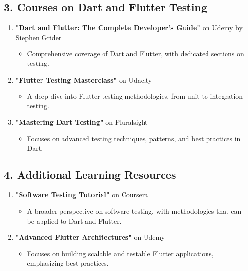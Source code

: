 \subsection*{3. Courses on Dart and Flutter Testing}

\begin{enumerate}
 \item \textbf{"Dart and Flutter: The Complete Developer's Guide"} on Udemy by Stephen Grider
 \begin{itemize}
  \item Comprehensive coverage of Dart and Flutter, with dedicated sections on testing.
 \end{itemize}

 \item \textbf{"Flutter Testing Masterclass"} on Udacity
 \begin{itemize}
  \item A deep dive into Flutter testing methodologies, from unit to integration testing.
 \end{itemize}
 \item \textbf{"Mastering Dart Testing"} on Pluralsight
 \begin{itemize}
  \item Focuses on advanced testing techniques, patterns, and best practices in Dart.
 \end{itemize}
\end{enumerate}

\subsection*{4. Additional Learning Resources}

\begin{enumerate}
 \item \textbf{"Software Testing Tutorial"} on Coursera
 \begin{itemize}
  \item A broader perspective on software testing, with methodologies that can be applied to Dart and Flutter.
 \end{itemize}

 \item \textbf{"Advanced Flutter Architectures"} on Udemy
 \begin{itemize}
  \item Focuses on building scalable and testable Flutter applications, emphasizing best practices.
 \end{itemize}
\end{enumerate}

